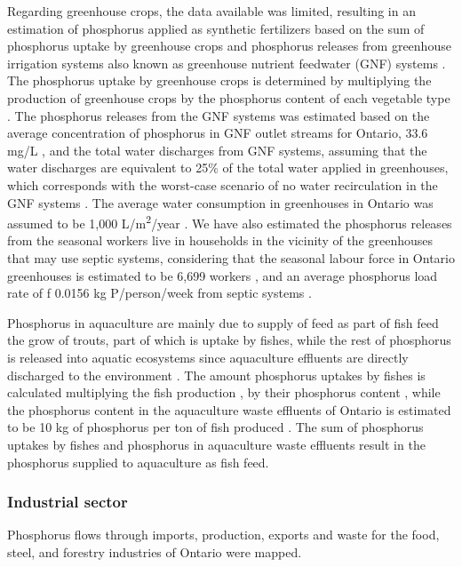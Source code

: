 \documentclass[authoryear]{elsarticle}
\begin{document}
Regarding greenhouse crops, the data available was limited, resulting in an estimation of phosphorus applied as synthetic fertilizers based on the sum of phosphorus uptake by greenhouse crops
and phosphorus releases from greenhouse irrigation systems also known as greenhouse nutrient feedwater (GNF) systems \citep{GNFOntario}. The phosphorus uptake by greenhouse crops is determined by multiplying the production of greenhouse crops \citep{HorticulturalOntario} by the phosphorus content of each vegetable type \citep{USDAHandbook}. The phosphorus releases from the GNF systems was estimated based on the average concentration of phosphorus in GNF outlet streams for  Ontario, 33.6 mg/L \citep{GreenhouseReleases}, and the total water discharges from GNF systems, assuming that the water discharges are equivalent to 25\% of the total water applied in greenhouses, which corresponds with the worst-case scenario of no water recirculation in the GNF systems \citep{GNFOntario}. The average water consumption in greenhouses in Ontario was assumed to be 1,000 L/m\textsuperscript{2}/year \citep{GrowingVeggiesOntario}. We have also estimated the phosphorus releases from the seasonal workers live in households in the vicinity of the greenhouses that may use septic systems, considering that the seasonal labour force in Ontario greenhouses is estimated to be 6,699 workers \citep{GreenhouseWorkers}, and an average phosphorus load rate of f 0.0156 kg P/person/week from septic systems \citep{oldfield2020estimation}.

Phosphorus in aquaculture are mainly due to supply of feed as part of fish feed the grow of trouts, part of which is uptake by fishes, while the rest of phosphorus is released into aquatic ecosystems since aquaculture effluents are directly discharged to the environment \citep{OntarioAquaculture}. The amount phosphorus uptakes by fishes
is calculated multiplying the fish production \citep{StatisticsCanadaAquaculture}, by their phosphorus content \citep{CanadianNutrientFile}, while the phosphorus content in the aquaculture waste effluents of Ontario is estimated to be 10 kg of phosphorus per ton of fish produced \citep{bureau2003chemical}. The sum of phosphorus uptakes by fishes and phosphorus in aquaculture waste effluents result in the phosphorus supplied to aquaculture as fish feed.

\subsubsection{Industrial sector}
Phosphorus flows through imports, production, exports and waste for the food, steel, and forestry industries of Ontario were mapped.
\end{document}

